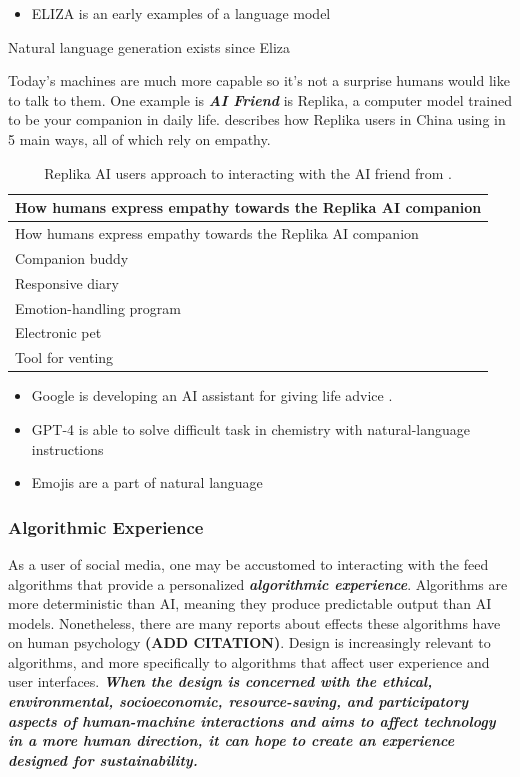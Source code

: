 \documentclass[
  letterpaper,
  DIV=11,
  numbers=noendperiod]{scrartcl}
\providecommand{\tightlist}{%
  \setlength{\itemsep}{0pt}\setlength{\parskip}{0pt}}\usepackage{longtable,booktabs,array}
\begin{document}
\begin{itemize}
\tightlist
\item
  ELIZA is an early examples of a language model
\end{itemize}

Natural language generation exists since Eliza

Today's machines are much more capable so it's not a surprise humans
would like to talk to them. One example is \textbf{\emph{AI Friend}} is
Replika, a computer model trained to be your companion in daily life.
\citep{jiangChatbotEmergencyExist2022} describes how Replika users in
China using in 5 main ways, all of which rely on empathy.

\begin{longtable}[]{@{}l@{}}
\caption{Replika AI users approach to interacting with the AI friend
from \citet{jiangChatbotEmergencyExist2022}.}\tabularnewline
\toprule\noalign{}
How humans express empathy towards the Replika AI companion \\
\midrule\noalign{}
\endfirsthead
\toprule\noalign{}
How humans express empathy towards the Replika AI companion \\
\midrule\noalign{}
\endhead
\bottomrule\noalign{}
\endlastfoot
Companion buddy \\
Responsive diary \\
Emotion-handling program \\
Electronic pet \\
Tool for venting \\
\end{longtable}

\begin{itemize}
\tightlist
\item
  Google is developing an AI assistant for giving life advice
  \citet{goswamiGoogleReportedlyBuilding2023}.
\item
  GPT-4 is able to solve difficult task in chemistry with
  natural-language instructions \citet{whiteFutureChemistryLanguage2023}
\item
  Emojis are a part of natural language \citet{tayWhyScienceNeeds2023}
\end{itemize}

\subsubsection{Algorithmic Experience}\label{algorithmic-experience}

As a user of social media, one may be accustomed to interacting with the
feed algorithms that provide a personalized \textbf{\emph{algorithmic
experience}}. Algorithms are more deterministic than AI, meaning they
produce predictable output than AI models. Nonetheless, there are many
reports about effects these algorithms have on human psychology
\textbf{(ADD CITATION)}. Design is increasingly relevant to algorithms,
and more specifically to algorithms that affect user experience and user
interfaces. \textbf{\emph{When the design is concerned with the ethical,
environmental, socioeconomic, resource-saving, and participatory aspects
of human-machine interactions and aims to affect technology in a more
human direction, it can hope to create an experience designed for
sustainability.}}
\end{document}
